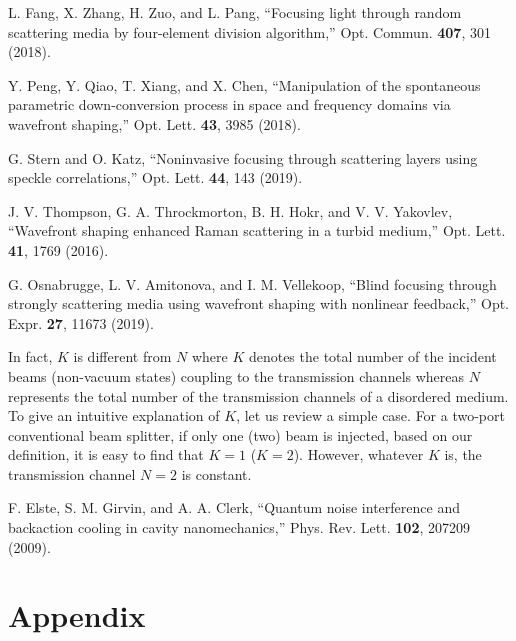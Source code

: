 \documentclass[9pt,twocolumn,twoside]{osajnl}
\begin{document}
\begin{thebibliography}{99}
 L. Fang, X. Zhang, H. Zuo, and L. Pang, \enquote{Focusing light through random scattering media by four-element division algorithm,} Opt. Commun. \textbf{407}, 301 (2018).

 Y. Peng, Y. Qiao, T. Xiang, and X. Chen, \enquote{Manipulation of the spontaneous parametric down-conversion process in space and frequency domains via wavefront shaping,} Opt. Lett. \textbf{43}, 3985 (2018).

 G. Stern and O. Katz, \enquote{Noninvasive focusing through scattering layers using speckle correlations,} Opt. Lett. \textbf{44}, 143 (2019).

  J. V. Thompson, G. A. Throckmorton, B. H. Hokr, and V. V. Yakovlev, \enquote{Wavefront shaping enhanced Raman scattering in a turbid medium,} Opt. Lett. \textbf{41}, 1769 (2016).

 G. Osnabrugge, L. V. Amitonova, and I. M. Vellekoop, \enquote{Blind focusing through strongly scattering media using wavefront shaping with nonlinear feedback,} Opt. Expr. \textbf{27}, 11673 (2019).

 In fact, $K$ is different from $N$ where $K$ denotes the total number of the incident beams (non-vacuum states) coupling to the transmission channels whereas $N$ represents the total number of the transmission channels of a disordered medium. To give an intuitive explanation of $K$, let us review a simple case. For a two-port conventional beam splitter, if only one (two) beam is injected, based on our definition, it is easy to find that $K=1$ ($K=2$). However, whatever $K$ is, the transmission channel $N=2$ is constant.

 F. Elste, S. M. Girvin, and A. A. Clerk, \enquote{Quantum noise interference and backaction cooling in cavity nanomechanics,} Phys. Rev. Lett. \textbf{102}, 207209 (2009).



\end{thebibliography}
\onecolumn
\section{Appendix}
\end{document}
